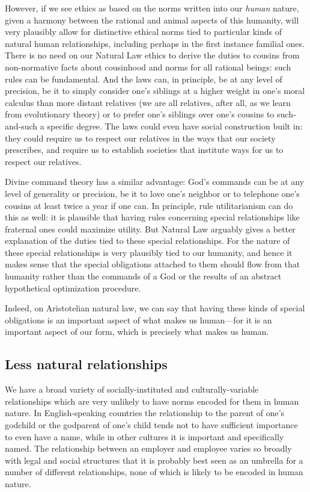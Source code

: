 However, if we see ethics as based on the norms written into our \textit{human} nature, given a harmony between the rational and animal aspects of this humanity,
will very plausibly allow for distinctive ethical norms tied to particular kinds of natural human relationships, including perhaps in the first instance familial ones.
There is no need on our Natural Law ethics to derive the duties to cousins from non-normative facts about cousinhood and norms for all rational beings: such rules
can be fundamental. And the laws can, in principle, be at any level of precision, be it to simply consider one's siblings at a higher weight in one's moral calculus
than more distant relatives (we are all relatives, after all, as we learn from evolutionary theory) or to prefer one's siblings over one's cousins to such-and-such 
a specific degree. The laws could even have social construction built in: they could require us to respect our relatives in the ways that our society prescribes,
and require us to establish societies that institute ways for us to respect our relatives.

Divine command theory has a similar advantage: God's commands can be at any level of generality or precision, be it to love one's neighbor or to telephone one's cousins 
at least twice a year if one can. In principle, rule utilitarianism can do this as well: it is plausible that having rules concerning special relationships like
fraternal ones could maximize utility. But Natural Law arguably gives a better explanation of the duties tied to these special relationships. For the nature of these 
special relationships is very plausibly tied to our humanity, and hence it makes sense that the special obligations attached to them should flow from that humanity
rather than the commands of a God or the results of an abstract hypothetical optimization procedure. 

Indeed, on Aristotelian natural law, we can say that having these kinds of special obligations is an important aspect of what makes us human---for it is an important
aspect of our form, which is precisely what makes us human. 

\subsection{Less natural relationships}
We have a broad variety of socially-instituted and culturally-variable relationships which are very unlikely to have norms encoded 
for them in human nature.  In English-speaking countries the relationship to the  parent of one's godchild or the godparent of one's child
tends not to have sufficient importance to even have a name, while in other cultures it is important and specifically named. The relationship
between an employer and employee varies so broadly with legal and social structures that it is probably best seen as an umbrella for a number
of different relationships, none of which is likely to be encoded in human nature. 

